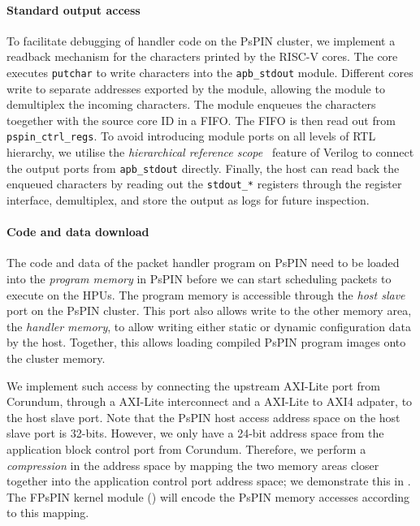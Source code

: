 \paragraph{Standard output access} To facilitate debugging of handler code on the PsPIN cluster, we implement a readback mechanism for the characters printed by the RISC-V cores.  The core executes \texttt{putchar} to write characters into the \texttt{apb\_stdout} module.  Different cores write to separate addresses exported by the module, allowing the module to demultiplex the incoming characters.  The module enqueues the characters toegether with the source core ID in a FIFO.  The FIFO is then read out from \texttt{pspin\_ctrl\_regs}.  To avoid introducing module ports on all levels of RTL hierarchy, we utilise the \emph{hierarchical reference scope}~\cite{noauthor_verilog_nodate} feature of Verilog to connect the output ports from \texttt{apb\_stdout} directly.  Finally, the host can read back the enqueued characters by reading out the \texttt{stdout\_*} registers through the register interface, demultiplex, and store the output as logs for future inspection.

\paragraph{Code and data download} The code and data of the packet handler program on PsPIN need to be loaded into the \emph{program memory} in PsPIN before we can start scheduling packets to execute on the HPUs.  The program memory is accessible through the \emph{host slave} port on the PsPIN cluster.  This port also allows write to the other memory area, the \emph{handler memory}, to allow writing either static or dynamic configuration data by the host.  Together, this allows loading compiled PsPIN program images onto the cluster memory.

We implement such access by connecting the upstream AXI-Lite port from Corundum, through a AXI-Lite interconnect and a AXI-Lite to AXI4 adpater, to the host slave port.  Note that the PsPIN host access address space on the host slave port is 32-bits.  However, we only have a 24-bit address space from the application block control port from Corundum.  Therefore, we perform a \emph{compression} in the address space by mapping the two memory areas closer together into the application control port address space; we demonstrate this in .  The FPsPIN kernel module () will encode the PsPIN memory accesses according to this mapping.

